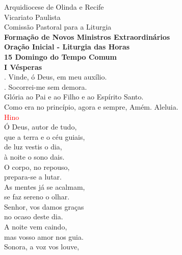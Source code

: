 \documentclass{book}
\begin{document}
\pagestyle{empty}
\begin{center}
    Arquidiocese de Olinda e Recife \\
    Vicariato Paulista \\
    Comissão Pastoral para a Liturgia
    \vspace{.2cm} \\
    \textbf{Formação de Novos Ministros Extraordinários}
    \vspace{.2cm} \\
    \textbf{Oração Inicial - Liturgia das Horas}
    \vspace{.2cm} \\
    \textbf{15\textordfeminine{} Domingo do Tempo Comum}
    \vspace{.2cm} \\
    \textbf{I Vésperas}
    \vspace{.2cm} \\
    {\color{red} \Vbar.} Vinde, ó Deus, em meu auxílio. \\
    {\color{red} \Rbar.} Socorrei-me sem demora. \\
    Glória ao Pai e ao Filho e ao Espírito Santo. \\
    Como era no princípio, agora e sempre, Amém. Aleluia.
    \vspace{.2cm} \\
    \textcolor{red}{Hino}
    \vspace{.2cm} \\
    Ó Deus, autor de tudo, \\
    que a terra e o céu guiais, \\
    de luz vestis o dia, \\
    à noite o sono dais.
    \vspace{.2cm} \\
    O corpo, no repouso, \\
    prepara-se a lutar. \\
    As mentes já se acalmam, \\
    se faz sereno o olhar.
    \vspace{.2cm} \\
    Senhor, vos damos graças \\
    no ocaso deste dia. \\
    A noite vem caindo, \\
    mas vosso amor nos guia.
    \vspace{.2cm} \\
    Sonora, a voz vos louve, \\

\end{center}
\end{document}
